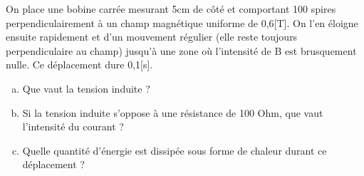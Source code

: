 \begin{exercise}
    On place une bobine carrée mesurant 5cm de côté et comportant 100 spires perpendiculairement à un champ magnétique uniforme de 0,6[T]. On l'en éloigne ensuite rapidement et d'un mouvement régulier (elle reste toujours perpendiculaire au champ) jusqu'à une zone où l'intensité de B est brusquement nulle. Ce déplacement dure 0,1[s].

    \begin{enumerate}[a)]
        \item Que vaut la tension induite ?
        \item Si la tension induite s'oppose à une résistance de 100 Ohm, que vaut l'intensité du courant ?
        \item Quelle quantité d'énergie est dissipée sous forme de chaleur durant ce déplacement ?
    \end{enumerate}
\end{exercise}
